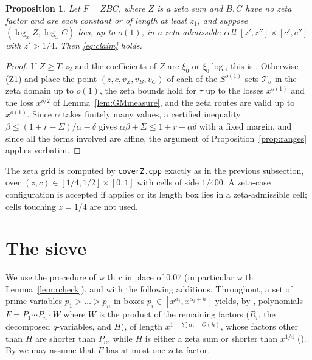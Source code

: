 \documentclass[11pt]{amsart}
\newtheorem{proposition}[theorem]{Proposition}
\theoremstyle{definition}
\theoremstyle{remark}
\begin{document}
\begin{proposition}\label{prop:zranges}
Let $F=ZBC$, where $Z$ is a zeta sum and $B,C$ have no zeta factor and are each constant or of length at least $z_1$, and suppose $(\log_xZ,\log_xC)$ lies, up to $o(1)$, in a zeta-admissible cell $[z',z'']\times[c',c'']$ with $z'>1/4$. Then \eqref{eq:claim} holds.
\end{proposition}

\begin{proof}
If $Z\ge T_1z_2$ and the coefficients of $Z$ are $\xi_0$ or $\xi_0\log$, this is \cite[Lemma~5.4]{J}. Otherwise (Z1) and \cite[Lemma~5.8]{J} place the point $(z,c,v_Z,v_B,v_C)$ of each of the $S^{o(1)}$ sets $\mathcal T_\sigma$ in the zeta domain up to $o(1)$, the zeta bounds hold for $\tau$ up to the losses $x^{o(1)}$ and the loss $x^{\delta/2}$ of Lemma~\ref{lem:GMmeasure}, and the zeta routes are valid up to $x^{o(1)}$. Since $\alpha$ takes finitely many values, a certified inequality $\beta\le(1+r-\Sigma)/\alpha-\delta$ gives $\alpha\beta+\Sigma\le1+r-\alpha\delta$ with a fixed margin, and since all the forms involved are affine, the argument of Proposition~\ref{prop:ranges} applies verbatim.
\end{proof}

The zeta grid is computed by \texttt{coverZ.cpp} exactly as in the previous subsection, over $(z,c)\in[1/4,1/2]\times[0,1]$ with cells of side $1/400$. A zeta-case configuration is accepted if \cite[Proposition~6.1(iii)]{J} applies or its length box lies in a zeta-admissible cell; cells touching $z=1/4$ are not used.

\section{The sieve}\label{sec:sieve}

We use the procedure of \cite[Section~7.2]{J} with $r$ in place of $0.07$ (in particular with Lemma~\ref{lem:rcheck}), and with the following additions. Throughout, a set of prime variables $p_1>\dots>p_n$ in boxes $p_i\in[x^{\alpha_i},x^{\alpha_i+h}]$ yields, by \cite[Section~4]{J}, polynomials $F=P_1\cdots P_n\cdot W$ where $W$ is the product of the remaining factors ($R_i$, the decomposed $q$-variables, and $H$), of length $x^{1-\sum\alpha_i+O(h)}$, whose factors other than $H$ are shorter than $P_n$, while $H$ is either a zeta sum or shorter than $x^{1/4}$ (\cite[Information~4.15, Remark~4.17]{J}). By \cite[Lemma~5.9]{J} we may assume that $F$ has at most one zeta factor.
\end{document}

